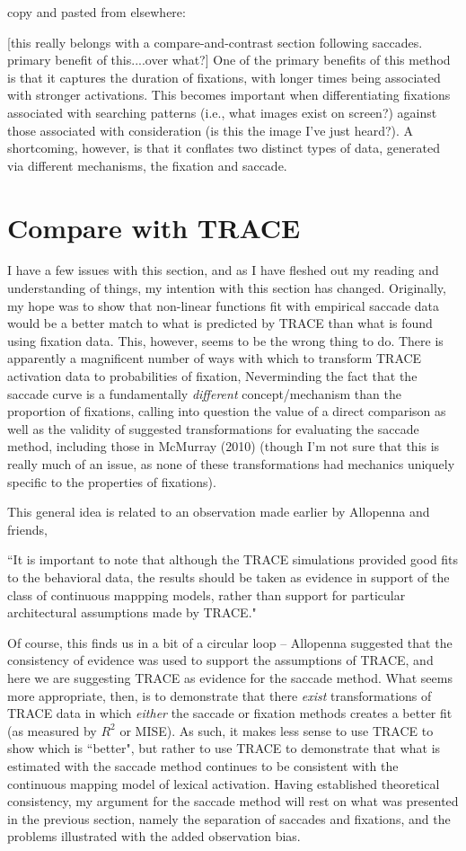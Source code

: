 \documentclass{article}
\begin{document}
copy and pasted from elsewhere:

[this really belongs with a compare-and-contrast section following saccades. primary benefit of this....over what?] One of the primary benefits of this method is that it captures the duration of fixations, with longer times being associated with stronger activations. This becomes important when differentiating fixations associated with searching patterns (i.e., what images exist on screen?) against those associated with consideration (is this the image I've just heard?). A shortcoming, however, is that it conflates two distinct types of data, generated via different mechanisms, the fixation and saccade. 

\section{Compare with TRACE}

I have a few issues with this section, and as I have fleshed out my reading and understanding of things, my intention with this section has changed. Originally, my hope was to show that non-linear functions fit with empirical saccade data would be a better match to what is predicted by TRACE than what is found using fixation data. This, however, seems to be the wrong thing to do. There is apparently a magnificent number of ways with which to transform TRACE activation data to probabilities of fixation, Neverminding the fact that the saccade curve is a fundamentally \textit{different} concept/mechanism than the proportion of fixations, calling into question the value of a direct comparison as well as the validity of suggested transformations for evaluating the saccade method, including those in McMurray (2010) (though I'm not sure that this is really much of an issue, as none of these transformations had mechanics uniquely specific to the properties of fixations).

 This general idea is related to an observation made earlier by Allopenna and friends, 

``It is important to note that although the TRACE simulations provided good fits to the behavioral data, the results should be taken as evidence in support of the class of continuous mappping models, rather than support for particular architectural assumptions made by TRACE."

Of course, this finds us in a bit of a circular loop -- Allopenna suggested that the consistency of evidence was used to support the assumptions of TRACE, and here we are suggesting TRACE as evidence for the saccade method. What seems more appropriate, then, is to demonstrate that there \textit{exist} transformations of TRACE data in which \textit{either} the saccade or fixation methods creates a better fit (as measured by $R^2$ or MISE). As such, it makes less sense to use TRACE to show which is ``better", but rather to use TRACE to demonstrate that what is estimated with the saccade method continues to be consistent with the continuous mapping model of lexical activation. Having established theoretical consistency, my argument for the saccade method will rest on what was presented in the previous section, namely the separation of saccades and fixations, and the problems illustrated with the added observation bias. 
\end{document}

